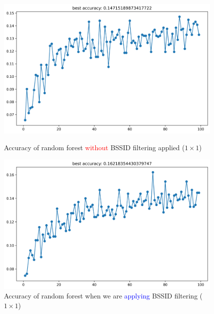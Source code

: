 \documentclass[runningheads]{llncs}
\begin{document}
\begin{figure}[tbh!]
	\centering
        \begin{minipage}{0.48\linewidth}
		\centering
		\includegraphics[width=\linewidth]{figures/image6.png}
		\caption{Accuracy of random forest \textcolor{red}{without} BSSID filtering applied ($1\times1$)}
		\label{fig:rf_acc_nofilter}
	\end{minipage}
	\hfill
        \begin{minipage}{0.48\linewidth}
		\centering
		\includegraphics[width=\linewidth]{figures/image5.png}
		\caption{Accuracy of random forest when we are \textcolor{blue}{applying} BSSID filtering ($1\times1$)}
		\label{fig:rf_acc_filter}
	\end{minipage}
	
	\vspace{0.5cm} %
	

\end{figure}
\end{document}

